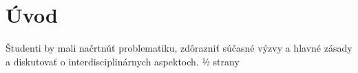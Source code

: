 \chapter{Úvod}
\par{
Študenti by mali načrtnúť problematiku, zdôrazniť súčasné výzvy a hlavné zásady a diskutovať o interdisciplinárnych aspektoch. ½ strany
}
